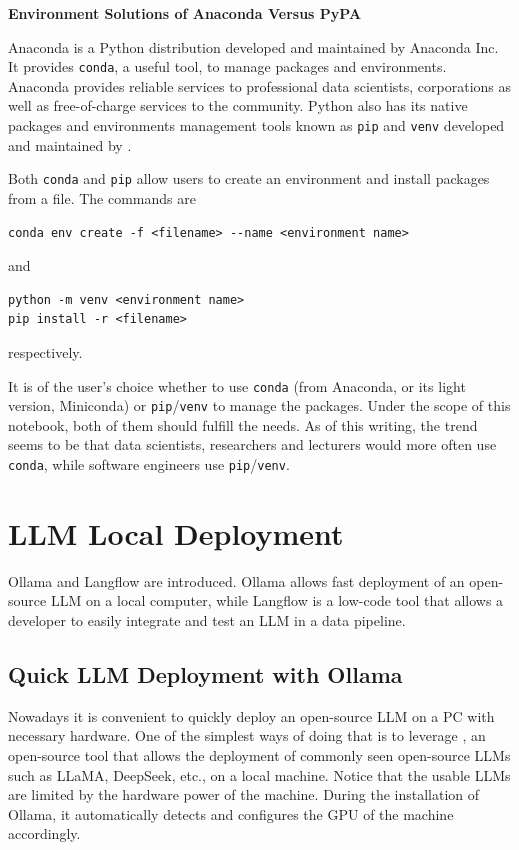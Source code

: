 \begin{mdframed}
\noindent \textbf{Environment Solutions of Anaconda Versus PyPA}

Anaconda is a Python distribution developed and maintained by Anaconda Inc. It provides \verb|conda|, a useful tool, to manage packages and environments. Anaconda provides reliable services to professional data scientists, corporations as well as free-of-charge services to the community. Python also has its native packages and environments management tools known as \verb|pip| and \verb|venv| developed and maintained by .

Both \verb|conda| and \verb|pip| allow users to create an environment and install packages from a file. The commands are
\begin{lstlisting}
conda env create -f <filename> --name <environment name>
\end{lstlisting}
and
\begin{lstlisting}
python -m venv <environment name>
pip install -r <filename>
\end{lstlisting}
respectively.

It is of the user's choice whether to use \verb|conda| (from Anaconda, or its light version, Miniconda) or \verb|pip|/\verb|venv| to manage the packages. Under the scope of this notebook, both of them should fulfill the needs. As of this writing, the trend seems to be that data scientists, researchers and lecturers would more often use \verb|conda|, while software engineers use \verb|pip|/\verb|venv|.
\end{mdframed}

\section{LLM Local Deployment}

Ollama and Langflow are introduced. Ollama allows fast deployment of an open-source LLM on a local computer, while Langflow is a low-code tool that allows a developer to easily integrate and test an LLM in a data pipeline.

\subsection{Quick LLM Deployment with Ollama}

Nowadays it is convenient to quickly deploy an open-source LLM on a PC with necessary hardware. One of the simplest ways of doing that is to leverage , an open-source tool that allows the deployment of commonly seen open-source LLMs such as LLaMA, DeepSeek, etc., on a local machine. Notice that the usable LLMs are limited by the hardware power of the machine. During the installation of Ollama, it automatically detects and configures the GPU of the machine accordingly.

